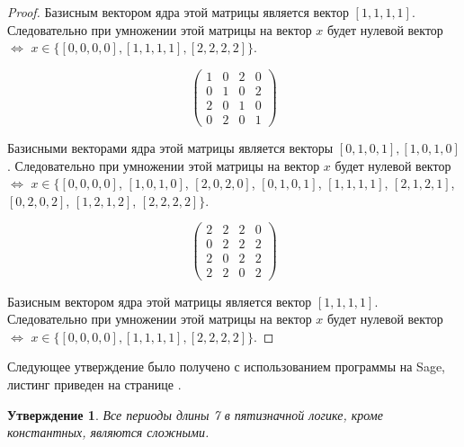 \documentclass[bibliography=totoc, a4paper, 14pt]{extarticle}
\newtheorem*{myst}{Утверждение}
\begin{document}
\begin{proof}
Базисным вектором ядра этой матрицы является вектор $[1, 1, 1, 1]$. Следовательно при умножении этой матрицы на
вектор $x$ будет нулевой вектор $\Leftrightarrow$ $x \in \{[0, 0, 0, 0], [1, 1, 1, 1], [2, 2, 2, 2]\}$.

$$ \begin{pmatrix}
1 & 0 & 2 & 0 \\
0 & 1 & 0 & 2 \\
2 & 0 & 1 & 0 \\
0 & 2 & 0 & 1
\end{pmatrix} $$

Базисными векторами ядра этой матрицы является векторы $[0, 1, 0, 1], [1,0,1,0]$. Следовательно при умножении
этой матрицы на вектор $x$ будет нулевой вектор $\Leftrightarrow$ $x \in \{[0, 0, 0, 0]$, $[1, 0, 1, 0]$,
$[2, 0, 2, 0]$, $[0, 1, 0, 1]$, $[1, 1, 1, 1]$, $[2, 1, 2, 1]$, $[0, 2, 0, 2]$, $[1, 2, 1, 2]$, $[2, 2, 2, 2]\}$.

$$ \begin{pmatrix}
2 & 2 & 2 & 0 \\
0 & 2 & 2 & 2 \\
2 & 0 & 2 & 2 \\
2 & 2 & 0 & 2
\end{pmatrix} $$

Базисным вектором ядра этой матрицы является вектор $[1, 1, 1, 1]$. Следовательно при умножении этой матрицы на
вектор $x$ будет нулевой вектор $\Leftrightarrow$ $x \in \{[0, 0, 0, 0], [1, 1, 1, 1], [2, 2, 2, 2]\}$.
\end{proof}

Следующее утверждение было получено с использованием программы на {S}age,
листинг приведен на странице \pageref{sub:sage}.

\begin{myst}
Все периоды длины 7 в пятизначной логике, кроме константных, являются сложными.
\end{myst}
\end{document}
